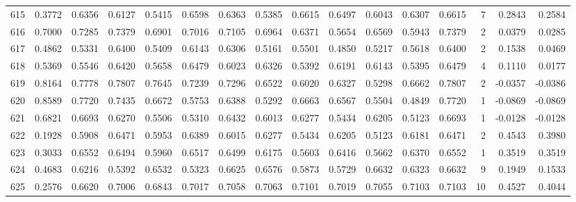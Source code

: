 \begin{tabular}{lrrrrrrrrrrrrrrr}
615 &      0.3772 &  0.6356 &  0.6127 &  0.5415 &  0.6598 &  0.6363 &  0.5385 &  0.6615 &  0.6497 &  0.6043 &   0.6307 &     0.6615 &      7 &                    0.2843 &                     0.2584 \\
616 &      0.7000 &  0.7285 &  0.7379 &  0.6901 &  0.7016 &  0.7105 &  0.6964 &  0.6371 &  0.5654 &  0.6569 &   0.5943 &     0.7379 &      2 &                    0.0379 &                     0.0285 \\
617 &      0.4862 &  0.5331 &  0.6400 &  0.5409 &  0.6143 &  0.6306 &  0.5161 &  0.5501 &  0.4850 &  0.5217 &   0.5618 &     0.6400 &      2 &                    0.1538 &                     0.0469 \\
618 &      0.5369 &  0.5546 &  0.6420 &  0.5658 &  0.6479 &  0.6023 &  0.6326 &  0.5392 &  0.6191 &  0.6143 &   0.5395 &     0.6479 &      4 &                    0.1110 &                     0.0177 \\
619 &      0.8164 &  0.7778 &  0.7807 &  0.7645 &  0.7239 &  0.7296 &  0.6522 &  0.6020 &  0.6327 &  0.5298 &   0.6662 &     0.7807 &      2 &                   -0.0357 &                    -0.0386 \\
620 &      0.8589 &  0.7720 &  0.7435 &  0.6672 &  0.5753 &  0.6388 &  0.5292 &  0.6663 &  0.6567 &  0.5504 &   0.4849 &     0.7720 &      1 &                   -0.0869 &                    -0.0869 \\
621 &      0.6821 &  0.6693 &  0.6270 &  0.5506 &  0.5310 &  0.6432 &  0.6013 &  0.6277 &  0.5434 &  0.6205 &   0.5123 &     0.6693 &      1 &                   -0.0128 &                    -0.0128 \\
622 &      0.1928 &  0.5908 &  0.6471 &  0.5953 &  0.6389 &  0.6015 &  0.6277 &  0.5434 &  0.6205 &  0.5123 &   0.6181 &     0.6471 &      2 &                    0.4543 &                     0.3980 \\
623 &      0.3033 &  0.6552 &  0.6494 &  0.5960 &  0.6517 &  0.6499 &  0.6175 &  0.5603 &  0.6416 &  0.5662 &   0.6370 &     0.6552 &      1 &                    0.3519 &                     0.3519 \\
624 &      0.4683 &  0.6216 &  0.5392 &  0.6532 &  0.5323 &  0.6625 &  0.6576 &  0.5873 &  0.5729 &  0.6632 &   0.6323 &     0.6632 &      9 &                    0.1949 &                     0.1533 \\
625 &      0.2576 &  0.6620 &  0.7006 &  0.6843 &  0.7017 &  0.7058 &  0.7063 &  0.7101 &  0.7019 &  0.7055 &   0.7103 &     0.7103 &     10 &                    0.4527 &                     0.4044 \\

\end{tabular}
